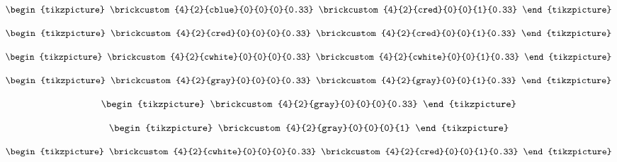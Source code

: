 \begin{equation}\label{eq:lego-blue1-red1}
\begin{tikzpicture}
\brickcustom{4}{2}{cblue}{0}{0}{0}{0.33}
\brickcustom{4}{2}{cred}{0}{0}{1}{0.33} %
\end{tikzpicture}
\end{equation}

\begin{equation}\label{eq:lego-red1-red1}
\begin{tikzpicture}
\brickcustom{4}{2}{cred}{0}{0}{0}{0.33}
\brickcustom{4}{2}{cred}{0}{0}{1}{0.33} %
\end{tikzpicture}
\end{equation}

\begin{equation}\label{eq:lego-white1-white1}
\begin{tikzpicture}
\brickcustom{4}{2}{cwhite}{0}{0}{0}{0.33}
\brickcustom{4}{2}{cwhite}{0}{0}{1}{0.33} %
\end{tikzpicture}
\end{equation}

\begin{equation}\label{eq:lego-grey1-grey1}
\begin{tikzpicture}
\brickcustom{4}{2}{gray}{0}{0}{0}{0.33}
\brickcustom{4}{2}{gray}{0}{0}{1}{0.33} %
\end{tikzpicture}
\end{equation}


\begin{equation}\label{eq:lego-grey1}
\begin{tikzpicture}
\brickcustom{4}{2}{gray}{0}{0}{0}{0.33}
\end{tikzpicture}
\end{equation}


\begin{equation}\label{eq:lego-grey3}
\begin{tikzpicture}
\brickcustom{4}{2}{gray}{0}{0}{0}{1}
\end{tikzpicture}
\end{equation}


\begin{equation}\label{eq:lego-white1-red1}
\begin{tikzpicture}
\brickcustom{4}{2}{cwhite}{0}{0}{0}{0.33}
\brickcustom{4}{2}{cred}{0}{0}{1}{0.33} %
\end{tikzpicture}
\end{equation}


